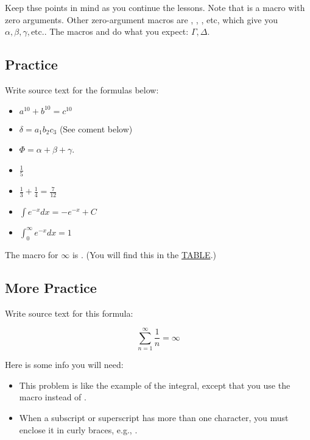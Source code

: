 Keep thse points in mind as you continue the lessons.  Note that  is a macro with zero arguments.  Other zero-argument macros are , , , etc, which give you $\alpha, \beta, \gamma, \text{etc.}$.  The macros  and  do what you expect: $\Gamma, \Delta$.

\subsection{Practice}

Write source text for the formulas below:

\begin{itemize}

\item $ a^{10} + b^{10} = c^{10} $

\item $ \delta = a_1b_2c_3 $ (See coment below)

\item $\Phi = \alpha + \beta + \gamma$.

\item $\frac{1}{5}$

\item $\frac{1}{3} + \frac{1}{4} = \frac{7}{12}$

\item $\int e^{-x} dx = -e^{-x} + C$

\item $\int_0^\infty e^{-x} dx = 1$

\end{itemize}

The macro for $\infty$ is . (You will find this in the \href{https://katex.org/docs/supported.html}{TABLE}.)



\subsection{More Practice}

Write source text for this formula:

$$
\sum_{n=1}^\infty \frac{1}{n} = \infty
$$

Here is some info you will need:

\begin{itemize}

\item This problem is like the example of the integral, except that you use the macro 
 instead of .

\item When a subscript or superscript has more than one character, you must enclose it in curly braces, e.g., .



\end{itemize}

